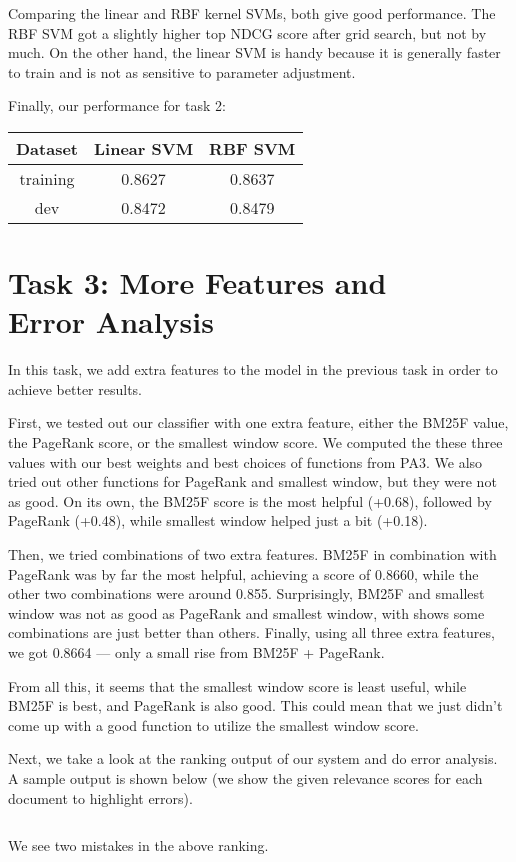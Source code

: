 \documentclass[10pt,twocolumn]{article}
\begin{document}
Comparing the linear and RBF kernel SVMs, both give good performance. The RBF SVM got a slightly higher top NDCG score after grid search, but not by much. On the other hand, the linear SVM is handy because it is generally faster to train and is not as sensitive to parameter adjustment.

Finally, our performance for task 2:
\begin{table}[H]
\centering
\begin{tabular}{|c|c|c|}
\hline
Dataset & Linear SVM & RBF SVM \\\hline
training & 0.8627 & 0.8637 \\\hline
dev & 0.8472 & 0.8479\\\hline
\end{tabular}
\end{table}

\section*{Task 3: More Features and \\Error Analysis}
In this task, we add extra features to the model in the previous task in order to achieve better results.

First, we tested out our classifier with one extra feature, either the BM25F value, the PageRank score, or the smallest window score. We computed the these three values with our best weights and best choices of functions from PA3. We also tried out other functions for PageRank and smallest window, but they were not as good. On its own, the BM25F score is the most helpful (+0.68), followed by PageRank (+0.48), while smallest window helped just a bit (+0.18).

Then, we tried combinations of two extra features. BM25F in combination with PageRank was by far the most helpful, achieving a score of 0.8660, while the other two combinations were around 0.855. Surprisingly, BM25F and smallest window was not as good as PageRank and smallest window, with shows some combinations are just better than others. Finally, using all three extra features, we got 0.8664 --- only a small rise from BM25F + PageRank.

From all this, it seems that the smallest window score is least useful, while BM25F is best, and PageRank is also good. This could mean that we just didn't come up with a good function to utilize the smallest window score.

Next, we take a look at the ranking output of our system and do error analysis. A sample output is shown below (we show the given relevance scores for each document to highlight errors).
\begin{verbatim}

\end{verbatim}
We see two mistakes in the above ranking. 
\end{document}
